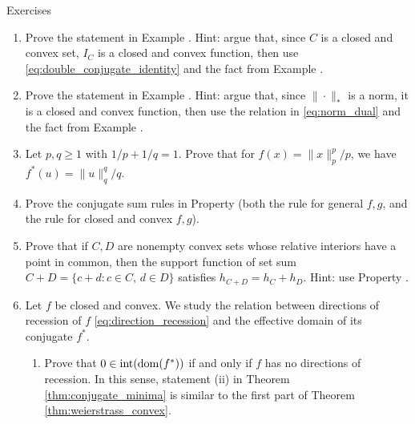 \begin{xcb}{Exercises}
\begin{enumerate}[label=\thechapter.\arabic*]
\item \label{ex:support_function_conjugate}
  Prove the statement in Example . Hint:
  argue that, since $C$ is a closed and convex set, $I_C$ is a closed and convex
  function, then use \eqref{eq:double_conjugate_identity} and the fact from 
  Example . 

\item \label{ex:norm_conjugate}
  Prove the statement in Example . Hint: argue that,
  since $\|\cdot\|_*$ is a norm, it is a closed and convex function, then use
  the relation in \eqref{eq:norm_dual} and the fact from Example 
  .  
 
\item Let $p,q \geq 1$ with $1/p + 1/q = 1$. Prove that for $f(x) =
  \|x\|_p^p/p$, we have $f^*(u) = \|u\|_q^q/q$.   

\item Prove the conjugate sum rules in Property
   (both the rule for general $f,g$, and the
  rule for closed and convex $f,g$).  

\item Prove that if $C,D$ are nonempty convex sets whose relative interiors have
  a point in common, then the support function of set sum $C+D = \{ c + d : c 
  \in C, \, d \in D \}$ satisfies $h_{C+D} = h_C + h_D$. Hint: use Property
  . 

\item \label{ex:conjugate_recession}
  Let $f$ be closed and convex. We study the relation between directions of
  recession of $f$ \eqref{eq:direction_recession} and the effective domain of
  its conjugate $f^*$.      

\begin{enumerate}[label=\alph*.]
\item Prove that $0 \in \operatorname{int}(\operatorname{dom}(f^*))$ if and only if $f$ has no
  directions of recession. In this sense, statement (ii) in Theorem
  \ref{thm:conjugate_minima} is similar to the first part of Theorem
  \ref{thm:weierstrass_convex}.   


\end{enumerate}
\end{enumerate}
\end{xcb}
